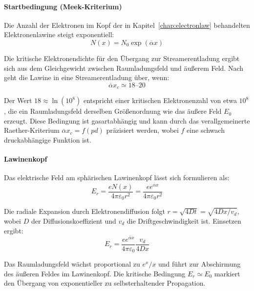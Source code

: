 \paragraph{Startbedingung (Meek-Kriterium)}
Die Anzahl der Elektronen im Kopf der in Kapitel~\ref{chap:electronlaw} behandelten Elektronenlawine steigt exponentiell:
\begin{equation}
    N(x) = N_0 \exp(\overline{\alpha} x)
\end{equation}

Die kritische Elektronendichte für den Übergang zur Streamerentladung ergibt sich aus dem Gleichgewicht zwischen Raumladungsfeld und äußerem Feld. Nach \textcite{meek1940} geht die Lawine in eine Streamerentladung über, wenn:
\begin{equation}
    \overline{\alpha} x_c \simeq 18\text{--}20
    \label{eq:meek}
\end{equation}

Der Wert $18 \approx \ln(10^8)$ entspricht einer kritischen Elektronenzahl von etwa $10^8$, die ein Raumladungsfeld derselben Größenordnung wie das äußere Feld $E_0$ erzeugt. Diese Bedingung ist gasartabhängig und kann durch das verallgemeinerte Raether-Kriterium $\overline{\alpha} x_c = f(pd)$ präzisiert werden, wobei $f$ eine schwach druckabhängige Funktion ist.


\paragraph{Lawinenkopf}
Das elektrische Feld am sphärischen Lawinenkopf lässt sich formulieren als:
\begin{equation}
    E_r = \frac{e N(x)}{4\pi \varepsilon_0 r^2} = \frac{e e^{\overline{\alpha}x}}{4\pi \varepsilon_0 r^2}
    \label{eq:electronlawfield}
\end{equation}

Die radiale Expansion durch Elektronendiffusion folgt $r = \sqrt{4Dt} = \sqrt{4Dx/v_d}$, wobei $D$ der Diffusionskoeffizient und $v_d$ die Driftgeschwindigkeit ist. Einsetzen ergibt:
\begin{equation}
    E_r = \frac{e e^{\overline{\alpha}x}}{4\pi \varepsilon_0} \frac{v_d}{4Dx}
    \label{eq:electronlawfielddif}
\end{equation}

Das Raumladungsfeld wächst proportional zu $e^x/x$ und führt zur Abschirmung des äußeren Feldes im Lawinenkopf. Die kritische Bedingung $E_r \simeq E_0$ markiert den Übergang von exponentieller zu selbsterhaltender Propagation.


